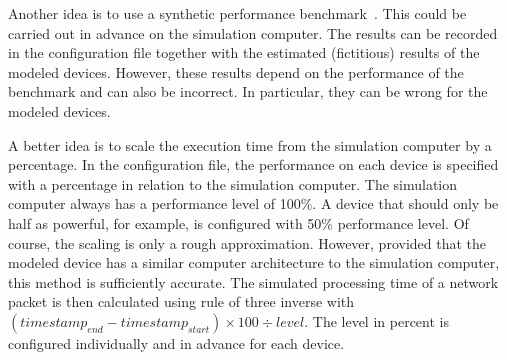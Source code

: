 \documentclass[english,version-2019-11]{uzl-thesis}
\begin{document}
Another idea is to use a synthetic performance benchmark~\cite{MIPS}. This could be carried out in advance on the simulation computer. The results can be recorded in the configuration file together with the estimated (fictitious) results of the modeled devices. However, these results depend on the performance of the benchmark and can also be incorrect. In particular, they can be wrong for the modeled devices.

A better idea is to scale the execution time from the simulation computer by a percentage. In the configuration file, the performance on each device is specified with a percentage in relation to the simulation computer. The simulation computer always has a performance level of 100\%. A device that should only be half as powerful, for example, is configured with 50\% performance level. Of course, the scaling is only a rough approximation. However, provided that the modeled device has a similar computer architecture to the simulation computer, this method is sufficiently accurate. The simulated processing time of a network packet is then calculated using rule of three inverse with $(timestamp_{end} - timestamp_{start}) \times 100 \div level$. The level in percent is configured individually and in advance for each device.
\end{document}
